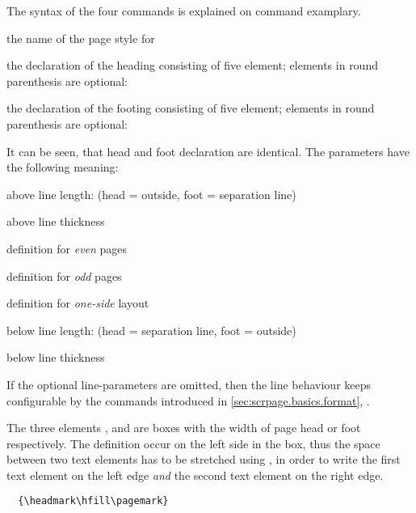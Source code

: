The syntax of the four commands is explained on command
 examplary.
\begin{labeling}[\,--]{}
\item[\PName{name}] the name of the page style for
\item[\PName{head-definition}]  the declaration of the heading consisting
        of five element; elements in round parenthesis are optional:\\
\item[\PName{foot-definition}]  the declaration of the footing consisting
        of five element; elements in round parenthesis are optional:\\  
\end{labeling}

It can be seen, that head and foot declaration are identical.
The parameters have the following meaning:
\begin{labeling}[\,--]{}
\item[\PName{ALL}] above line length: (head = outside, foot = separation line)
\item[\PName{ALT}] above line thickness
\item[\PName{EP}]  definition for \emph{even} pages
\item[\PName{OP}]  definition for \emph{odd} pages
\item[\PName{OS}]  definition for \emph{one-side} layout
\item[\PName{BLL}] below line length: (head = separation line, foot = outside)
\item[\PName{BLT}] below line thickness
\end{labeling}
If the optional line-parameters are omitted, then the line behaviour keeps
configurable by the commands introduced in
\autoref{sec:scrpage.basics.format},
.

The three elements ,  and  are boxes with
the width of page head or foot respectively.
The definition occur on the left side in the box, thus the space between
two text elements has to be stretched using , in order to
write the first text element on the left edge \emph{and} the second text
element on the right edge.
%
\begin{lstlisting}
  {\headmark\hfill\pagemark}
\end{lstlisting}

